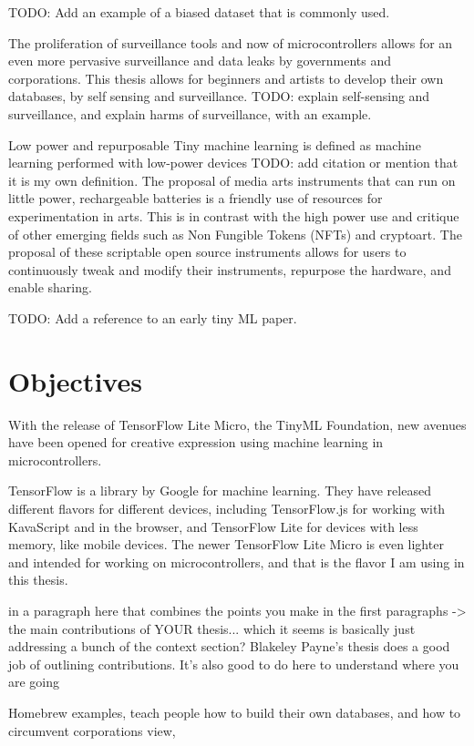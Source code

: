 TODO: Add an example of a biased dataset that is commonly used.

The proliferation of surveillance tools and now of microcontrollers allows for an even more pervasive surveillance and data leaks by governments and corporations. This thesis allows for beginners and artists to develop their own databases, by self sensing and surveillance. TODO: explain self-sensing and surveillance, and explain harms of surveillance, with an example.

Low power and repurposable
Tiny machine learning is defined as machine learning performed with low-power devices TODO: add citation or mention that it is my own definition. The proposal of media arts instruments that can run on little power, rechargeable batteries is a friendly use of resources for experimentation in arts. This is in contrast with the high power use and critique of other emerging fields such as Non Fungible Tokens (NFTs) and cryptoart. The proposal of these scriptable open source instruments allows for users to continuously tweak and modify their instruments, repurpose the hardware, and enable sharing.

TODO: Add a reference to an early tiny ML paper.

\section{Objectives}

With the release of TensorFlow Lite Micro, the TinyML Foundation, new avenues have been opened for creative expression using machine learning in microcontrollers.

TensorFlow is a library by Google for machine learning. They have released different flavors for different devices, including TensorFlow.js for working with KavaScript and in the browser, and TensorFlow Lite for devices with less memory, like mobile devices. The newer TensorFlow Lite Micro is even lighter and intended for working on microcontrollers, and that is the flavor I am using in this thesis.

in a paragraph here that combines the points you make in the first paragraphs -> the main contributions of YOUR thesis... which it seems is basically just addressing a bunch of the context section? Blakeley Payne's thesis does a good job of outlining contributions. It's also good to do here to understand where you are going

Homebrew examples, teach people how to build their own databases, and how to circumvent corporations view,

